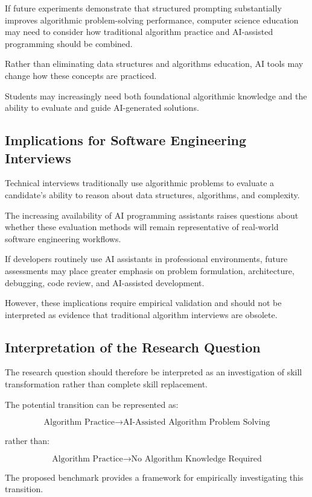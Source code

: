 If future experiments demonstrate that structured prompting substantially
improves algorithmic problem-solving performance, computer science education
may need to consider how traditional algorithm practice and AI-assisted
programming should be combined.

Rather than eliminating data structures and algorithms education, AI tools may
change how these concepts are practiced.

Students may increasingly need both foundational algorithmic knowledge and the
ability to evaluate and guide AI-generated solutions.

\subsection{Implications for Software Engineering Interviews}

Technical interviews traditionally use algorithmic problems to evaluate a
candidate's ability to reason about data structures, algorithms, and
complexity.

The increasing availability of AI programming assistants raises questions
about whether these evaluation methods will remain representative of real-world
software engineering workflows.

If developers routinely use AI assistants in professional environments,
future assessments may place greater emphasis on problem formulation,
architecture, debugging, code review, and AI-assisted development.

However, these implications require empirical validation and should not be
interpreted as evidence that traditional algorithm interviews are obsolete.

\subsection{Interpretation of the Research Question}

The research question should therefore be interpreted as an investigation of
skill transformation rather than complete skill replacement.

The potential transition can be represented as:

\[
\text{Algorithm Practice}
\rightarrow
\text{AI-Assisted Algorithm Problem Solving}
\]

rather than:

\[
\text{Algorithm Practice}
\rightarrow
\text{No Algorithm Knowledge Required}
\]

The proposed benchmark provides a framework for empirically investigating this
transition.
